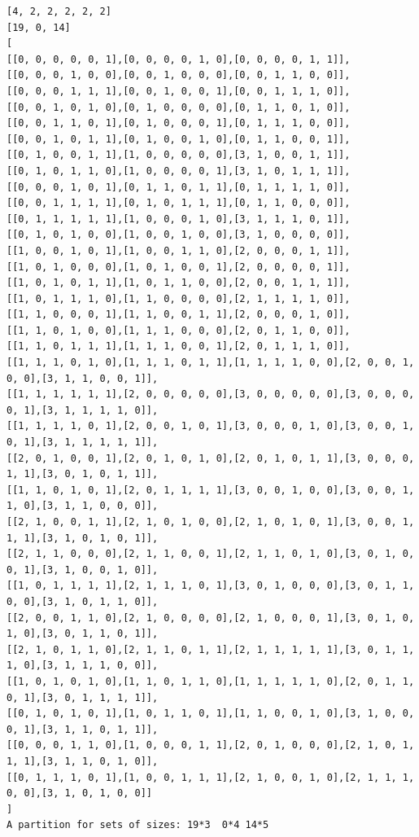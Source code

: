 \documentclass[final]{dmtcs-episciences}
\begin{document}
\begin{appendices}
\begin{verbatim} 
[4, 2, 2, 2, 2, 2]
[19, 0, 14]
[
[[0, 0, 0, 0, 0, 1],[0, 0, 0, 0, 1, 0],[0, 0, 0, 0, 1, 1]],
[[0, 0, 0, 1, 0, 0],[0, 0, 1, 0, 0, 0],[0, 0, 1, 1, 0, 0]],
[[0, 0, 0, 1, 1, 1],[0, 0, 1, 0, 0, 1],[0, 0, 1, 1, 1, 0]],
[[0, 0, 1, 0, 1, 0],[0, 1, 0, 0, 0, 0],[0, 1, 1, 0, 1, 0]],
[[0, 0, 1, 1, 0, 1],[0, 1, 0, 0, 0, 1],[0, 1, 1, 1, 0, 0]],
[[0, 0, 1, 0, 1, 1],[0, 1, 0, 0, 1, 0],[0, 1, 1, 0, 0, 1]],
[[0, 1, 0, 0, 1, 1],[1, 0, 0, 0, 0, 0],[3, 1, 0, 0, 1, 1]],
[[0, 1, 0, 1, 1, 0],[1, 0, 0, 0, 0, 1],[3, 1, 0, 1, 1, 1]],
[[0, 0, 0, 1, 0, 1],[0, 1, 1, 0, 1, 1],[0, 1, 1, 1, 1, 0]],
[[0, 0, 1, 1, 1, 1],[0, 1, 0, 1, 1, 1],[0, 1, 1, 0, 0, 0]],
[[0, 1, 1, 1, 1, 1],[1, 0, 0, 0, 1, 0],[3, 1, 1, 1, 0, 1]],
[[0, 1, 0, 1, 0, 0],[1, 0, 0, 1, 0, 0],[3, 1, 0, 0, 0, 0]],
[[1, 0, 0, 1, 0, 1],[1, 0, 0, 1, 1, 0],[2, 0, 0, 0, 1, 1]],
[[1, 0, 1, 0, 0, 0],[1, 0, 1, 0, 0, 1],[2, 0, 0, 0, 0, 1]],
[[1, 0, 1, 0, 1, 1],[1, 0, 1, 1, 0, 0],[2, 0, 0, 1, 1, 1]],
[[1, 0, 1, 1, 1, 0],[1, 1, 0, 0, 0, 0],[2, 1, 1, 1, 1, 0]],
[[1, 1, 0, 0, 0, 1],[1, 1, 0, 0, 1, 1],[2, 0, 0, 0, 1, 0]],
[[1, 1, 0, 1, 0, 0],[1, 1, 1, 0, 0, 0],[2, 0, 1, 1, 0, 0]],
[[1, 1, 0, 1, 1, 1],[1, 1, 1, 0, 0, 1],[2, 0, 1, 1, 1, 0]],
[[1, 1, 1, 0, 1, 0],[1, 1, 1, 0, 1, 1],[1, 1, 1, 1, 0, 0],[2, 0, 0, 1, 0, 0],[3, 1, 1, 0, 0, 1]],
[[1, 1, 1, 1, 1, 1],[2, 0, 0, 0, 0, 0],[3, 0, 0, 0, 0, 0],[3, 0, 0, 0, 0, 1],[3, 1, 1, 1, 1, 0]],
[[1, 1, 1, 1, 0, 1],[2, 0, 0, 1, 0, 1],[3, 0, 0, 0, 1, 0],[3, 0, 0, 1, 0, 1],[3, 1, 1, 1, 1, 1]],
[[2, 0, 1, 0, 0, 1],[2, 0, 1, 0, 1, 0],[2, 0, 1, 0, 1, 1],[3, 0, 0, 0, 1, 1],[3, 0, 1, 0, 1, 1]],
[[1, 1, 0, 1, 0, 1],[2, 0, 1, 1, 1, 1],[3, 0, 0, 1, 0, 0],[3, 0, 0, 1, 1, 0],[3, 1, 1, 0, 0, 0]],
[[2, 1, 0, 0, 1, 1],[2, 1, 0, 1, 0, 0],[2, 1, 0, 1, 0, 1],[3, 0, 0, 1, 1, 1],[3, 1, 0, 1, 0, 1]],
[[2, 1, 1, 0, 0, 0],[2, 1, 1, 0, 0, 1],[2, 1, 1, 0, 1, 0],[3, 0, 1, 0, 0, 1],[3, 1, 0, 0, 1, 0]],
[[1, 0, 1, 1, 1, 1],[2, 1, 1, 1, 0, 1],[3, 0, 1, 0, 0, 0],[3, 0, 1, 1, 0, 0],[3, 1, 0, 1, 1, 0]],
[[2, 0, 0, 1, 1, 0],[2, 1, 0, 0, 0, 0],[2, 1, 0, 0, 0, 1],[3, 0, 1, 0, 1, 0],[3, 0, 1, 1, 0, 1]],
[[2, 1, 0, 1, 1, 0],[2, 1, 1, 0, 1, 1],[2, 1, 1, 1, 1, 1],[3, 0, 1, 1, 1, 0],[3, 1, 1, 1, 0, 0]],
[[1, 0, 1, 0, 1, 0],[1, 1, 0, 1, 1, 0],[1, 1, 1, 1, 1, 0],[2, 0, 1, 1, 0, 1],[3, 0, 1, 1, 1, 1]],
[[0, 1, 0, 1, 0, 1],[1, 0, 1, 1, 0, 1],[1, 1, 0, 0, 1, 0],[3, 1, 0, 0, 0, 1],[3, 1, 1, 0, 1, 1]],
[[0, 0, 0, 1, 1, 0],[1, 0, 0, 0, 1, 1],[2, 0, 1, 0, 0, 0],[2, 1, 0, 1, 1, 1],[3, 1, 1, 0, 1, 0]],
[[0, 1, 1, 1, 0, 1],[1, 0, 0, 1, 1, 1],[2, 1, 0, 0, 1, 0],[2, 1, 1, 1, 0, 0],[3, 1, 0, 1, 0, 0]]
]
A partition for sets of sizes: 19*3  0*4 14*5
\end{verbatim}
\newpage


\end{appendices}
\end{document}
